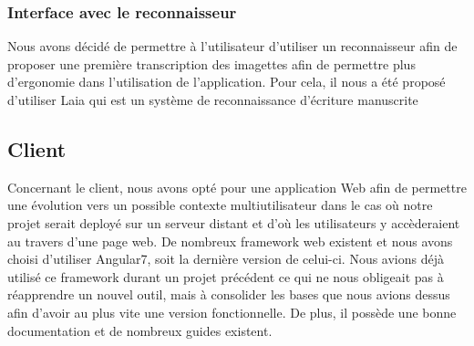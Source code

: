 \subsubsection{Interface avec le reconnaisseur}

Nous avons décidé de permettre à l'utilisateur d'utiliser un reconnaisseur afin de proposer une première transcription des imagettes afin de permettre plus d'ergonomie dans l'utilisation de l'application. Pour cela, il nous a été proposé d'utiliser Laia qui est un système de reconnaissance d'écriture manuscrite

\subsection{Client}

Concernant le client, nous avons opté pour une application Web afin de permettre une évolution vers un possible contexte multiutilisateur dans le cas où notre projet serait deployé sur un serveur distant et d'où les utilisateurs y accèderaient au travers d'une page web. De nombreux framework web existent et nous avons choisi d'utiliser Angular7, soit la dernière version de celui-ci. Nous avions déjà utilisé ce framework durant un projet précédent ce qui ne nous obligeait pas à réapprendre un nouvel outil, mais à consolider les bases que nous avions dessus afin d'avoir au plus vite une version fonctionnelle. De plus, il possède une bonne documentation et de nombreux guides existent.